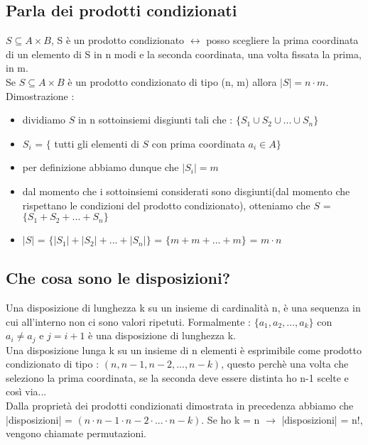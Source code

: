 \documentclass[a4paper,12pt]{report}
\begin{document}
	\subsection{Parla dei prodotti condizionati}
	$S \subseteq A \times B$, S è un prodotto condizionato $\leftrightarrow$ posso scegliere la prima coordinata di un elemento di S in n modi e la seconda coordinata, una volta fissata la prima, in m. \\
	Se $S \subseteq A \times B$ è un prodotto condizionato di tipo (n, m) allora $|S| = n \cdot m$. \\
	Dimostrazione : 
	\begin{itemize}
		\item dividiamo $S$ in n sottoinsiemi disgiunti tali che : $\{S_1 \cup S_2 \cup ... \cup S_n\}$
		\item $S_i$ = $\{$ tutti gli elementi di $S$ con prima coordinata $a_i \in A \}$
		\item per definizione abbiamo dunque che $|S_i| = m$
		\item dal momento che i sottoinsiemi considerati sono disgiunti(dal momento che rispettano le condizioni del prodotto condizionato), otteniamo che $S$ = $\{S_1 + S_2 + ... + S_n\}$
		\item $|S|$ = $\{|S_1| + |S_2| + ... + |S_n|\}$ = $\{ m + m + ... + m \}$ = $m \cdot n$
	\end{itemize}
	\subsection{Che cosa sono le disposizioni?}
	Una disposizione di lunghezza k su un insieme di cardinalità n, è una sequenza in cui all'interno non ci sono valori ripetuti. Formalmente : $\{a_1, a_2, ..., a_k\}$ con $a_i \neq a_j$ e $j = i + 1$ è una disposizione di lunghezza k. \\
	Una disposizione lunga k su un insieme di n elementi è esprimibile come prodotto condizionato di tipo : $(n, n-1, n-2, ..., n-k)$, questo perchè una volta che seleziono la prima coordinata, se la seconda deve essere distinta ho n-1 scelte e così via... \\
	Dalla proprietà dei prodotti condizionati dimostrata in precedenza abbiamo che |disposizioni| = $(n \cdot n-1 \cdot n - 2 \cdot ... \cdot n-k)$.
	Se ho k = n $\rightarrow$ |disposizioni| = n!, vengono chiamate permutazioni.
	
	
\end{document}
